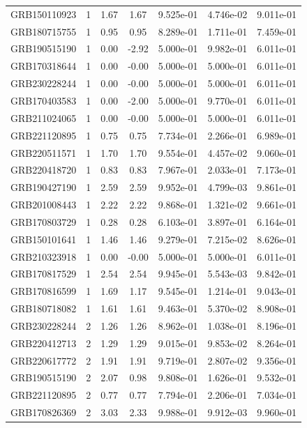 \documentclass[12pt]{article}
\begin{document}
\begin{table}[h!]
{\begin{tabular}{l c c c c c c}
GRB150110923 & 1 & 1.67 & 1.67 & 9.525e-01 & 4.746e-02 & 9.011e-01 \\
GRB180715755 & 1 & 0.95 & 0.95 & 8.289e-01 & 1.711e-01 & 7.459e-01 \\
GRB190515190 & 1 & 0.00 & -2.92 & 5.000e-01 & 9.982e-01 & 6.011e-01 \\
GRB170318644 & 1 & 0.00 & -0.00 & 5.000e-01 & 5.000e-01 & 6.011e-01 \\
GRB230228244 & 1 & 0.00 & -0.00 & 5.000e-01 & 5.000e-01 & 6.011e-01 \\
GRB170403583 & 1 & 0.00 & -2.00 & 5.000e-01 & 9.770e-01 & 6.011e-01 \\
GRB211024065 & 1 & 0.00 & -0.00 & 5.000e-01 & 5.000e-01 & 6.011e-01 \\
GRB221120895 & 1 & 0.75 & 0.75 & 7.734e-01 & 2.266e-01 & 6.989e-01 \\
GRB220511571 & 1 & 1.70 & 1.70 & 9.554e-01 & 4.457e-02 & 9.060e-01 \\
GRB220418720 & 1 & 0.83 & 0.83 & 7.967e-01 & 2.033e-01 & 7.173e-01 \\
GRB190427190 & 1 & 2.59 & 2.59 & 9.952e-01 & 4.799e-03 & 9.861e-01 \\
GRB201008443 & 1 & 2.22 & 2.22 & 9.868e-01 & 1.321e-02 & 9.661e-01 \\
GRB170803729 & 1 & 0.28 & 0.28 & 6.103e-01 & 3.897e-01 & 6.164e-01 \\
GRB150101641 & 1 & 1.46 & 1.46 & 9.279e-01 & 7.215e-02 & 8.626e-01 \\
GRB210323918 & 1 & 0.00 & -0.00 & 5.000e-01 & 5.000e-01 & 6.011e-01 \\
GRB170817529 & 1 & 2.54 & 2.54 & 9.945e-01 & 5.543e-03 & 9.842e-01 \\
GRB170816599 & 1 & 1.69 & 1.17 & 9.545e-01 & 1.214e-01 & 9.043e-01 \\
GRB180718082 & 1 & 1.61 & 1.61 & 9.463e-01 & 5.370e-02 & 8.908e-01 \\
GRB230228244 & 2 & 1.26 & 1.26 & 8.962e-01 & 1.038e-01 & 8.196e-01 \\
GRB220412713 & 2 & 1.29 & 1.29 & 9.015e-01 & 9.853e-02 & 8.264e-01 \\
GRB220617772 & 2 & 1.91 & 1.91 & 9.719e-01 & 2.807e-02 & 9.356e-01 \\
GRB190515190 & 2 & 2.07 & 0.98 & 9.808e-01 & 1.626e-01 & 9.532e-01 \\
GRB221120895 & 2 & 0.77 & 0.77 & 7.794e-01 & 2.206e-01 & 7.034e-01 \\
GRB170826369 & 2 & 3.03 & 2.33 & 9.988e-01 & 9.912e-03 & 9.960e-01 \\

\end{tabular}}
\end{table}
\end{document}
